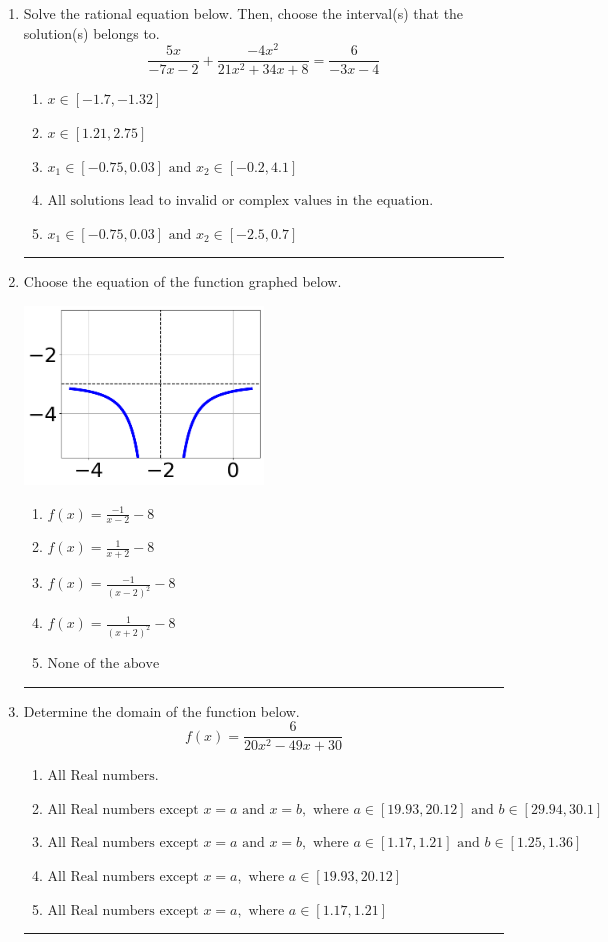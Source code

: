 \documentclass[14pt]{extbook}
\newcommand{\litem}[1]{\item#1\hspace*{-1cm}\rule{\textwidth}{0.4pt}}
\begin{document}
\begin{enumerate}
{\begin{enumerate}[label=\Alph*.]
\end{enumerate} }
\litem{
Solve the rational equation below. Then, choose the interval(s) that the solution(s) belongs to.\[ \frac{5x}{-7x -2} + \frac{-4x^{2}}{21x^{2} +34 x + 8} = \frac{6}{-3x -4} \]\begin{enumerate}[label=\Alph*.]
\item \( x \in [-1.7,-1.32] \)
\item \( x \in [1.21,2.75] \)
\item \( x_1 \in [-0.75, 0.03] \text{ and } x_2 \in [-0.2,4.1] \)
\item \( \text{All solutions lead to invalid or complex values in the equation.} \)
\item \( x_1 \in [-0.75, 0.03] \text{ and } x_2 \in [-2.5,0.7] \)

\end{enumerate} }
\litem{
Choose the equation of the function graphed below.
\begin{center}
    \includegraphics[width=0.5\textwidth]{../Figures/rationalGraphToEquationCopyB.png}
\end{center}
\begin{enumerate}[label=\Alph*.]
\item \( f(x) = \frac{-1}{x - 2} - 8 \)
\item \( f(x) = \frac{1}{x + 2} - 8 \)
\item \( f(x) = \frac{-1}{(x - 2)^2} - 8 \)
\item \( f(x) = \frac{1}{(x + 2)^2} - 8 \)
\item \( \text{None of the above} \)

\end{enumerate} }
\litem{
Determine the domain of the function below.\[ f(x) = \frac{6}{20x^{2} -49 x + 30} \]\begin{enumerate}[label=\Alph*.]
\item \( \text{All Real numbers.} \)
\item \( \text{All Real numbers except } x = a \text{ and } x = b, \text{ where } a \in [19.93, 20.12] \text{ and } b \in [29.94, 30.1] \)
\item \( \text{All Real numbers except } x = a \text{ and } x = b, \text{ where } a \in [1.17, 1.21] \text{ and } b \in [1.25, 1.36] \)
\item \( \text{All Real numbers except } x = a, \text{ where } a \in [19.93, 20.12] \)
\item \( \text{All Real numbers except } x = a, \text{ where } a \in [1.17, 1.21] \)


\end{enumerate}}
\end{enumerate}
\end{document}
